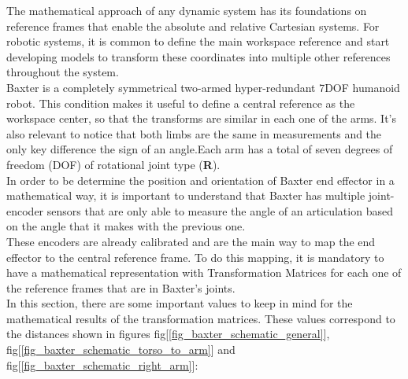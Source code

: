 \documentclass[11pt]{report} %
\begin{document}
The mathematical approach of any dynamic system has its foundations on reference frames that enable the absolute and relative Cartesian systems. For robotic systems, it is common to define the main workspace reference and start developing models to transform these coordinates into multiple other references throughout the system.\\

Baxter is a completely symmetrical two-armed hyper-redundant 7DOF humanoid robot. This condition makes it useful to define a central reference as the workspace center, so that the transforms are similar in each one of the arms. It's also relevant to notice that both limbs are the same in measurements and the only key difference the sign of an angle.Each arm has a total of seven degrees of freedom (DOF) of rotational joint type (\textbf{R}).\\

In order to be determine the position and orientation of Baxter end effector in a mathematical way, it is important to understand that Baxter has multiple joint-encoder sensors that are only able to measure the angle of an articulation based on the angle that it makes with the previous one.\\

These encoders are already calibrated and are the main way to map the end effector to the central reference frame. To do this mapping, it is mandatory to have a mathematical representation with Transformation Matrices for each one of the reference frames that are in Baxter's joints.\\

In this section, there are some important values to keep in mind for the mathematical results of the transformation matrices. These values correspond to the distances shown in figures fig[\ref{fig_baxter_schematic_general}], fig[\ref{fig_baxter_schematic_torso_to_arm}] and fig[\ref{fig_baxter_schematic_right_arm}]:
\end{document}
